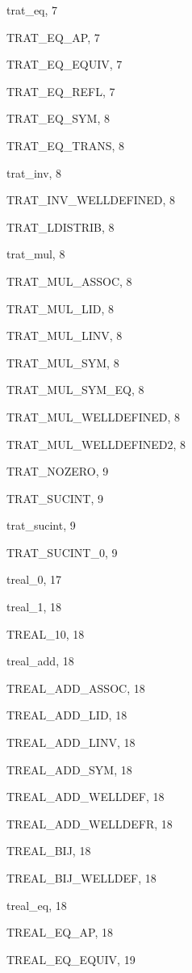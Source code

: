 \begin{theindex}
  \item {\ptt trat\_eq}, 7
  \item {\ptt TRAT\_EQ\_AP}, 7
  \item {\ptt TRAT\_EQ\_EQUIV}, 7
  \item {\ptt TRAT\_EQ\_REFL}, 7
  \item {\ptt TRAT\_EQ\_SYM}, 8
  \item {\ptt TRAT\_EQ\_TRANS}, 8
  \item {\ptt trat\_inv}, 8
  \item {\ptt TRAT\_INV\_WELLDEFINED}, 8
  \item {\ptt TRAT\_LDISTRIB}, 8
  \item {\ptt trat\_mul}, 8
  \item {\ptt TRAT\_MUL\_ASSOC}, 8
  \item {\ptt TRAT\_MUL\_LID}, 8
  \item {\ptt TRAT\_MUL\_LINV}, 8
  \item {\ptt TRAT\_MUL\_SYM}, 8
  \item {\ptt TRAT\_MUL\_SYM\_EQ}, 8
  \item {\ptt TRAT\_MUL\_WELLDEFINED}, 8
  \item {\ptt TRAT\_MUL\_WELLDEFINED2}, 8
  \item {\ptt TRAT\_NOZERO}, 9
  \item {\ptt TRAT\_SUCINT}, 9
  \item {\ptt trat\_sucint}, 9
  \item {\ptt TRAT\_SUCINT\_0}, 9
  \item {\ptt treal\_0}, 17
  \item {\ptt treal\_1}, 18
  \item {\ptt TREAL\_10}, 18
  \item {\ptt treal\_add}, 18
  \item {\ptt TREAL\_ADD\_ASSOC}, 18
  \item {\ptt TREAL\_ADD\_LID}, 18
  \item {\ptt TREAL\_ADD\_LINV}, 18
  \item {\ptt TREAL\_ADD\_SYM}, 18
  \item {\ptt TREAL\_ADD\_WELLDEF}, 18
  \item {\ptt TREAL\_ADD\_WELLDEFR}, 18
  \item {\ptt TREAL\_BIJ}, 18
  \item {\ptt TREAL\_BIJ\_WELLDEF}, 18
  \item {\ptt treal\_eq}, 18
  \item {\ptt TREAL\_EQ\_AP}, 18
  \item {\ptt TREAL\_EQ\_EQUIV}, 19

\end{theindex}
